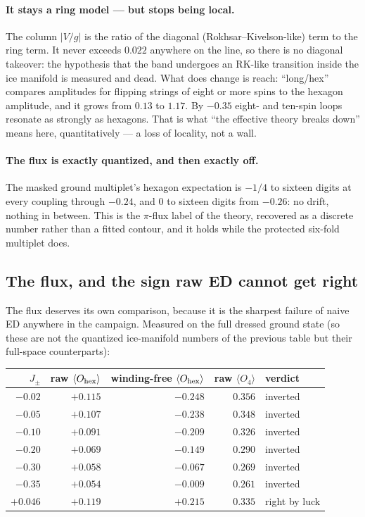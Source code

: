 \documentclass[11pt,a4paper]{article}
\newcommand{\Jpm}{J_{\pm}}
\newcommand{\Ohex}{O_{\rm hex}}
\newcommand{\Ofour}{O_{4}}
\begin{document}
\paragraph{It stays a ring model --- but stops being local.}  The column
$|V/g|$ is the ratio of the diagonal (Rokhsar--Kivelson-like) term to the
ring term.  It never exceeds $0.022$ anywhere on the line, so there is no
diagonal takeover: the hypothesis that the band undergoes an RK-like
transition inside the ice manifold is measured and dead.  What does change
is reach: ``long/hex'' compares amplitudes for flipping strings of eight or
more spins to the hexagon amplitude, and it grows from $0.13$ to $1.17$.  By
$-0.35$ eight- and ten-spin loops resonate as strongly as hexagons.  That is
what ``the effective theory breaks down'' means here, quantitatively --- a
loss of locality, not a wall.

\paragraph{The flux is exactly quantized, and then exactly off.}  The masked
ground multiplet's hexagon expectation is $-1/4$ to sixteen digits at every
coupling through $-0.24$, and $0$ to sixteen digits from $-0.26$: no drift,
nothing in between.  This is the $\pi$-flux label of the theory, recovered
as a discrete number rather than a fitted contour, and it holds while the
protected six-fold multiplet does.

\subsection{The flux, and the sign raw ED cannot get right}

The flux deserves its own comparison, because it is the sharpest failure of
naive ED anywhere in the campaign.  Measured on the full dressed ground
state (so these are not the quantized ice-manifold numbers of the previous
table but their full-space counterparts):

\begin{center}
\small
\begin{tabular}{rrrrl}
\toprule
$\Jpm$ & raw $\langle\Ohex\rangle$ & winding-free $\langle\Ohex\rangle$
       & raw $\langle\Ofour\rangle$ & verdict\\
\midrule
$-0.02$ & $+0.115$ & $-0.248$ & $0.356$ & inverted\\
$-0.05$ & $+0.107$ & $-0.238$ & $0.348$ & inverted\\
$-0.10$ & $+0.091$ & $-0.209$ & $0.326$ & inverted\\
$-0.20$ & $+0.069$ & $-0.149$ & $0.290$ & inverted\\
$-0.30$ & $+0.058$ & $-0.067$ & $0.269$ & inverted\\
$-0.35$ & $+0.054$ & $-0.009$ & $0.261$ & inverted\\
$+0.046$ & $+0.119$ & $+0.215$ & $0.335$ & right by luck\\
\bottomrule
\end{tabular}
\end{center}
\end{document}
